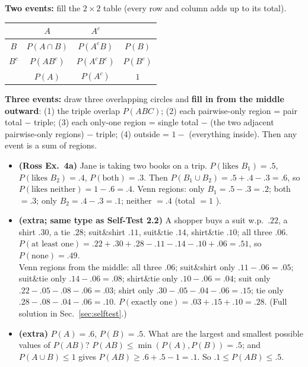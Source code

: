 \documentclass[11pt]{article}
\begin{document}
\begin{methodbox}
\textbf{Two events:} fill the $2\times2$ table (every row and column adds up to its total).
\begin{center}
\renewcommand{\arraystretch}{1.3}
\begin{tabular}{@{}c|c|c|c@{}}
 & $A$ & $A^c$ & \\\hline
$B$ & $P(A\cap B)$ & $P(A^cB)$ & $P(B)$\\\hline
$B^c$ & $P(AB^c)$ & $P(A^cB^c)$ & $P(B^c)$\\\hline
 & $P(A)$ & $P(A^c)$ & $1$
\end{tabular}
\end{center}
\textbf{Three events:} draw three overlapping circles and \textbf{fill in from the middle outward}: (1) the triple overlap $P(ABC)$; (2) each pairwise-only region = pair total $-$ triple; (3) each only-one region = single total $-$ (the two adjacent pairwise-only regions) $-$ triple; (4) outside = $1-$ (everything inside). Then any event is a sum of regions.
\end{methodbox}

\begin{exbox}[Examples]
\begin{itemize}
\item \textbf{(Ross Ex.\ 4a)} Jane is taking two books on a trip. $P(\text{likes }B_1)=.5$, $P(\text{likes }B_2)=.4$, $P(\text{both})=.3$. Then $P(B_1\cup B_2)=.5+.4-.3=.6$, so $P(\text{likes neither})=1-.6=.4$. Venn regions: only $B_1=.5-.3=.2$; both $=.3$; only $B_2=.4-.3=.1$; neither $=.4$ (total $=1$ \checkmark).
\item \textbf{(extra; same type as Self-Test 2.2)} A shopper buys a suit w.p.\ $.22$, a shirt $.30$, a tie $.28$; suit\&shirt $.11$, suit\&tie $.14$, shirt\&tie $.10$; all three $.06$.\\
$P(\text{at least one})=.22+.30+.28-.11-.14-.10+.06=.51$, so $P(\text{none})=.49$.\\
Venn regions from the middle: all three $.06$; suit\&shirt only $.11-.06=.05$; suit\&tie only $.14-.06=.08$; shirt\&tie only $.10-.06=.04$; suit only $.22-.05-.08-.06=.03$; shirt only $.30-.05-.04-.06=.15$; tie only $.28-.08-.04-.06=.10$. $P(\text{exactly one})=.03+.15+.10=.28$. (Full solution in Sec.~\ref{sec:selftest}.)
\item \textbf{(extra)} $P(A)=.6$, $P(B)=.5$. What are the largest and smallest possible values of $P(AB)$? $P(AB)\le\min(P(A),P(B))=.5$; and $P(A\cup B)\le1$ gives $P(AB)\ge.6+.5-1=.1$. So $.1\le P(AB)\le.5$.
\end{itemize}
\end{exbox}
\end{document}
